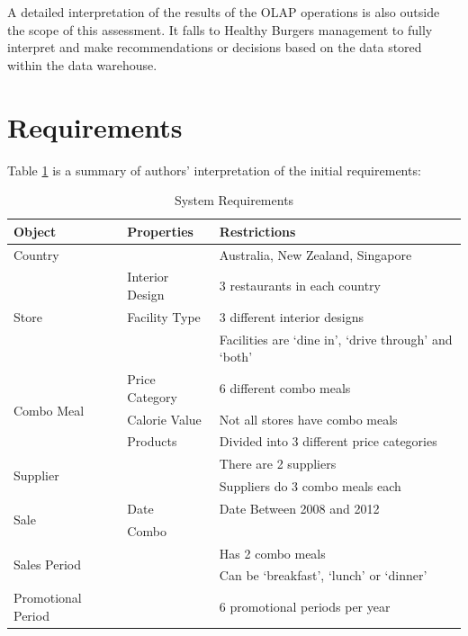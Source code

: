 \documentclass[12pt, a4paper]{article}
\begin{document}
A detailed interpretation of the results of the OLAP operations is also outside the scope of this assessment. It falls to Healthy Burgers management to fully interpret and make recommendations or decisions based on the data stored within the data warehouse.

\section*{Requirements}

Table \ref{tab:requirements} is a summary of authors' interpretation of the initial requirements:

\begin{table}

\begin{tabular}{|l|l|l|}

\hline
\textbf{Object} & \textbf{Properties} & \textbf{Restrictions} \\
\hline

Country & & Australia, New Zealand, Singapore \\
\hline

\multirow{3}{3cm}{Store} & Interior Design  & 3 restaurants in each country \\
 	& Facility Type & 3 different interior designs \\
	& & Facilities are `dine in', `drive through' and `both' \\
\hline

\multirow{3}{3cm}{Combo Meal} & Price Category & 6 different combo meals \\
	& Calorie Value & Not all stores have combo meals \\
	& Products & Divided into 3 different price categories \\ 

\hline

\multirow{2}{3cm}{Supplier} & & There are 2 suppliers \\ 
	& & Suppliers do 3 combo meals each\\
\hline

\multirow{2}{3cm}{Sale} & Date & Date Between 2008 and 2012 \\
	& Combo &  \\
\hline

\multirow{2}{3cm}{Sales Period} & & Has 2 combo meals \\ 
	& & Can be `breakfast', `lunch' or `dinner' \\
\hline	

Promotional Period & & 6 promotional periods per year\\

\hline

\end{tabular}

\caption{System Requirements}
\label{tab:requirements}

\end{table}
\end{document}
